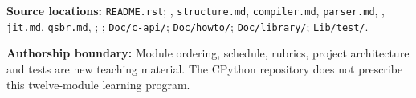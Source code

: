 \documentclass[
  11pt,
]{report}
\newcommand{\passthrough}[1]{#1}
\begin{document}
\textbf{Source locations:} \passthrough{\lstinline!README.rst!};
,
\passthrough{\lstinline!structure.md!},
\passthrough{\lstinline!compiler.md!},
\passthrough{\lstinline!parser.md!},
,
\passthrough{\lstinline!jit.md!}, \passthrough{\lstinline!qsbr.md!},
;
;
\passthrough{\lstinline!Doc/c-api/!};
\passthrough{\lstinline!Doc/howto/!};
\passthrough{\lstinline!Doc/library/!};
\passthrough{\lstinline!Lib/test/!}.

\textbf{Authorship boundary:} Module ordering, schedule, rubrics,
project architecture and tests are new teaching material. The CPython
repository does not prescribe this twelve-module learning program.
\end{document}
